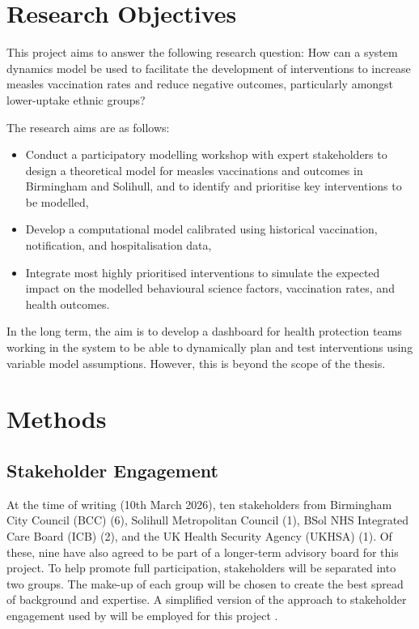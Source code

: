 \documentclass{article}
\begin{document}
\section{Research Objectives}

This project aims to answer the following research question: How can a system dynamics model be used to facilitate the development of interventions to increase measles vaccination rates and reduce negative outcomes, particularly amongst lower-uptake ethnic groups?

The research aims are as follows:
\begin{itemize}
    \item Conduct a participatory modelling workshop with expert stakeholders to design a theoretical model for measles vaccinations and outcomes in Birmingham and Solihull, and to identify and prioritise key interventions to be modelled,
    \item Develop a computational model calibrated using historical vaccination, notification, and hospitalisation data,
    \item Integrate most highly prioritised interventions to simulate the expected impact on the modelled behavioural science factors, vaccination rates, and health outcomes.
\end{itemize}

In the long term, the aim is to develop a dashboard for health protection teams working in the system to be able to dynamically plan and test interventions using variable model assumptions. However, this is beyond the scope of the thesis.

\section{Methods}

\subsection{Stakeholder Engagement}
\label{sec:engagement}
At the time of writing (10th March 2026), ten stakeholders from Birmingham City Council (BCC) (6), Solihull Metropolitan Council (1), BSol NHS Integrated Care Board (ICB) (2), and the UK Health Security Agency (UKHSA) (1).  Of these, nine have also agreed to be part of a longer-term advisory board for this project. To help promote full participation, stakeholders will be separated into two groups. The make-up of each group will be chosen to create the best spread of background and expertise. A simplified version of the approach to stakeholder engagement used by \citeauthor{michail2025evaluation} will be employed for this project \cite{michail2025evaluation}.
\end{document}
